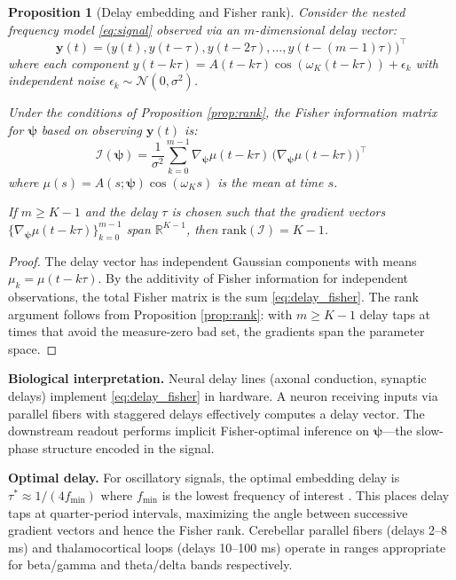 \documentclass[12pt]{article}
\newtheorem{proposition}[theorem]{Proposition}
\newcommand{\R}{\mathbb{R}}
\newcommand{\FIM}{\mathcal{I}}
\begin{document}
\begin{proposition}[Delay embedding and Fisher rank]
\label{prop:delay}
Consider the nested frequency model \eqref{eq:signal} observed via an $m$-dimensional delay vector:
\begin{equation}
\mathbf{y}(t) = \bigl(y(t), y(t-\tau), y(t-2\tau), \ldots, y(t-(m-1)\tau)\bigr)^\top
\end{equation}
where each component $y(t - k\tau) = A(t-k\tau)\cos(\omega_K(t-k\tau)) + \epsilon_k$ with independent noise $\epsilon_k \sim \mathcal{N}(0, \sigma^2)$.

Under the conditions of Proposition \ref{prop:rank}, the Fisher information matrix for $\bm{\psi}$ based on observing $\mathbf{y}(t)$ is:
\begin{equation}
\FIM(\bm{\psi}) = \frac{1}{\sigma^2} \sum_{k=0}^{m-1} \nabla_{\bm{\psi}} \mu(t-k\tau) \, \bigl(\nabla_{\bm{\psi}} \mu(t-k\tau)\bigr)^\top
\label{eq:delay_fisher}
\end{equation}
where $\mu(s) = A(s;\bm{\psi})\cos(\omega_K s)$ is the mean at time $s$.

If $m \geq K-1$ and the delay $\tau$ is chosen such that the gradient vectors $\{\nabla_{\bm{\psi}}\mu(t-k\tau)\}_{k=0}^{m-1}$ span $\R^{K-1}$, then $\mathrm{rank}(\FIM) = K-1$.
\end{proposition}

\begin{proof}
The delay vector has independent Gaussian components with means $\mu_k = \mu(t-k\tau)$. By the additivity of Fisher information for independent observations, the total Fisher matrix is the sum \eqref{eq:delay_fisher}. The rank argument follows from Proposition \ref{prop:rank}: with $m \geq K-1$ delay taps at times that avoid the measure-zero bad set, the gradients span the parameter space.
\end{proof}

\textbf{Biological interpretation.} Neural delay lines (axonal conduction, synaptic delays) implement \eqref{eq:delay_fisher} in hardware. A neuron receiving inputs via parallel fibers with staggered delays effectively computes a delay vector. The downstream readout performs implicit Fisher-optimal inference on $\bm{\psi}$---the slow-phase structure encoded in the signal.

\textbf{Optimal delay.} For oscillatory signals, the optimal embedding delay is $\tau^* \approx 1/(4f_{\min})$ where $f_{\min}$ is the lowest frequency of interest \citep{fraser1986}. This places delay taps at quarter-period intervals, maximizing the angle between successive gradient vectors and hence the Fisher rank. Cerebellar parallel fibers (delays 2--8 ms) and thalamocortical loops (delays 10--100 ms) operate in ranges appropriate for beta/gamma and theta/delta bands respectively.
\end{document}
